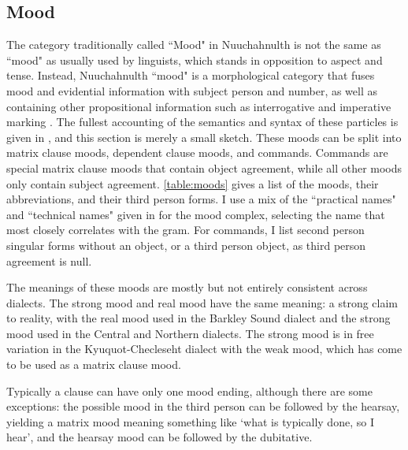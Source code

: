 \subsection{Mood} \label{sec:grams:mood}

The category traditionally called ``Mood" in Nuuchahnulth is not the same as ``mood" as usually used by linguists, which stands in opposition to aspect and tense. Instead, Nuuchahnulth ``mood" is a morphological category that fuses mood and evidential information with subject person and number, as well as containing other propositional information such as interrogative and imperative marking \citep{jacobsen1986}. The fullest accounting of the semantics and syntax of these particles is given in \citet[Chapter 4]{waldie2012}, and this section is merely a small sketch. These moods can be split into matrix clause moods, dependent clause moods, and commands. Commands are special matrix clause moods that contain object agreement, while all other moods only contain subject agreement. \cref{table:moods} gives a list of the moods, their abbreviations, and their third person forms. I use a mix of the ``practical names" and ``technical names" given in \citet{werle2015} for the mood complex, selecting the name that most closely correlates with the gram. For commands, I list second person singular forms without an object, or a third person object, as third person agreement is null.

The meanings of these moods are mostly but not entirely consistent across dialects. The strong mood and real mood have the same meaning: a strong claim to reality, with the real mood used in the Barkley Sound dialect and the strong mood used in the Central and Northern dialects. The strong mood is in free variation in the Kyuquot-Checleseht dialect with the weak mood, which has come to be used as a matrix clause mood.

Typically a clause can have only one mood ending, although there are some exceptions: the possible mood in the third person can be followed by the hearsay, yielding a matrix mood meaning something like `what is typically done, so I hear', and the hearsay mood can be followed by the dubitative.

\newpage

